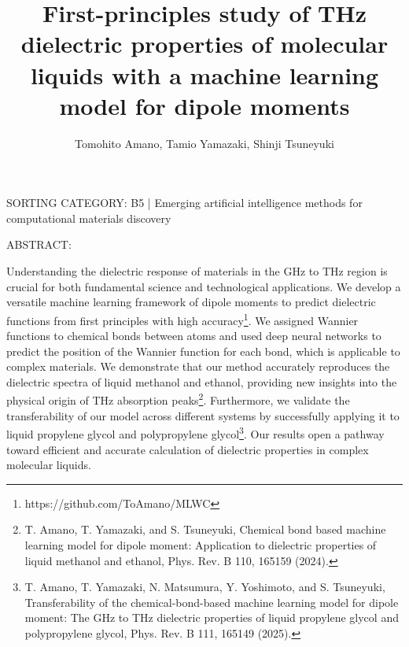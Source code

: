 \documentclass[11pt]{article}
\title{First-principles study of THz dielectric properties of molecular liquids with a machine learning model for dipole moments}
\author{Tomohito Amano, Tamio Yamazaki, Shinji Tsuneyuki}
\begin{document}
\maketitle



SORTING CATEGORY: B5 | Emerging artificial intelligence methods for computational materials discovery

ABSTRACT:

Understanding the dielectric response of materials in the GHz to THz region is crucial for both fundamental science and technological applications. We develop a versatile machine learning framework of dipole moments to predict dielectric functions from first principles with high accuracy\footnote{https://github.com/ToAmano/MLWC}. We assigned Wannier functions to chemical bonds between atoms and used deep neural networks to predict the position of the Wannier function for each bond, which is applicable to complex materials. We demonstrate that our method accurately reproduces the dielectric spectra of liquid methanol and ethanol, providing new insights into the physical origin of THz absorption peaks\footnote{T. Amano, T. Yamazaki, and S. Tsuneyuki, Chemical bond based machine learning model for dipole moment: Application to dielectric properties of liquid methanol and ethanol, Phys. Rev. B 110, 165159 (2024).}. Furthermore, we validate the transferability of our model across different systems by successfully applying it to liquid propylene glycol and polypropylene glycol\footnote{T. Amano, T. Yamazaki, N. Matsumura, Y. Yoshimoto, and S. Tsuneyuki, Transferability of the chemical-bond-based machine learning model for dipole moment: The GHz to THz dielectric properties of liquid propylene glycol and polypropylene glycol, Phys. Rev. B 111, 165149 (2025).}. Our results open a pathway toward efficient and accurate calculation of dielectric properties in complex molecular liquids.
\end{document}
